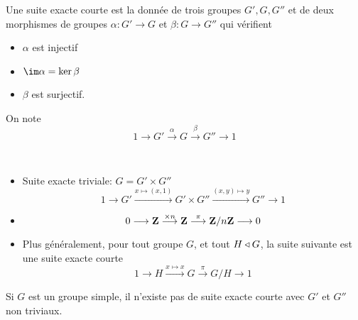 \begin{dfn}
    Une suite exacte courte est la donnée de trois groupes $G', G, G''$ et de deux morphismes de groupes  $\alpha:G'\longrightarrow G$ et $\beta:G \longrightarrow G''$ qui vérifient \begin{itemize}
        \item $\alpha$ est injectif
        \item $\im \alpha = \ker \beta$
        \item $\beta$ est surjectif.
    \end{itemize}
    On note \[
        1 \longrightarrow G' \overset{\alpha}\longrightarrow G\overset\beta\longrightarrow G''\longrightarrow 1
    \] 
\end{dfn}

\begin{ex}~
\begin{itemize}
    \item Suite exacte triviale: $G = G'\times G''$ \[
        1 \longrightarrow G' \overset{x\mapsto(x,1)}\longrightarrow G'\times G''\overset{(x,y)\mapsto y}\longrightarrow G''\longrightarrow 1
    \]
    \item \[
            0 \longrightarrow \mathbf Z \overset{\times n}\longrightarrow \mathbf Z \overset\pi\longrightarrow \mathbf Z / n\mathbf Z \longrightarrow 0
    \] 
    \item Plus généralement, pour tout groupe $G$, et tout $H\triangleleft G$, la suite suivante est une suite exacte courte \[
            1 \longrightarrow H \overset{x\mapsto x}\longrightarrow G\overset\pi\longrightarrow G / H \longrightarrow 1
    \] 
\end{itemize}
\end{ex}

\begin{rem}
Si $G$ est un groupe simple, il n'existe pas de suite exacte courte avec  $G'$ et  $G''$ non triviaux.
\end{rem}
